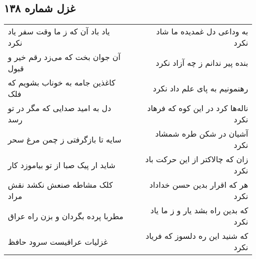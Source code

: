 \begin{center}
\section*{غزل شماره ۱۳۸}
\label{sec:sh138}
\begin{longtable}{l p{0.5cm} r}
یاد باد آن که ز ما وقت سفر یاد نکرد
&&
به وداعی دل غمدیده ما شاد نکرد
\\
آن جوان بخت که می‌زد رقم خیر و قبول
&&
بنده پیر ندانم ز چه آزاد نکرد
\\
کاغذین جامه به خوناب بشویم که فلک
&&
رهنمونیم به پای علم داد نکرد
\\
دل به امید صدایی که مگر در تو رسد
&&
ناله‌ها کرد در این کوه که فرهاد نکرد
\\
سایه تا بازگرفتی ز چمن مرغ سحر
&&
آشیان در شکن طره شمشاد نکرد
\\
شاید ار پیک صبا از تو بیاموزد کار
&&
زان که چالاکتر از این حرکت باد نکرد
\\
کلک مشاطه صنعش نکشد نقش مراد
&&
هر که اقرار بدین حسن خداداد نکرد
\\
مطربا پرده بگردان و بزن راه عراق
&&
که بدین راه بشد یار و ز ما یاد نکرد
\\
غزلیات عراقیست سرود حافظ
&&
که شنید این ره دلسوز که فریاد نکرد
\\
\end{longtable}
\end{center}
